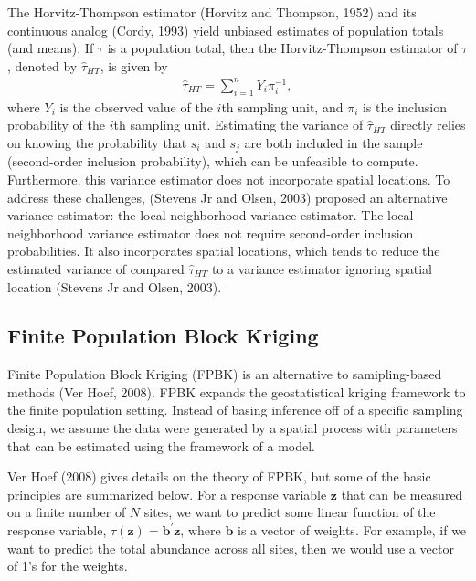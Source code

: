 \documentclass[]{elsarticle} %
\begin{document}
The Horvitz-Thompson estimator (Horvitz and Thompson, 1952) and its
continuous analog (Cordy, 1993) yield unbiased estimates of population
totals (and means). If \(\tau\) is a population total, then the
Horvitz-Thompson estimator of \(\tau\), denoted by \(\hat{\tau}_{HT}\),
is given by \begin{align}\label{eq:htest}
  \hat{\tau}_{HT} = \sum_{i = 1}^n Y_i \pi_i^{-1},
\end{align} where \(Y_i\) is the observed value of the \(i\)th sampling
unit, and \(\pi_i\) is the inclusion probability of the \(i\)th sampling
unit. Estimating the variance of \(\hat{\tau}_{HT}\) directly relies on
knowing the probability that \(s_i\) and \(s_j\) are both included in
the sample (second-order inclusion probability), which can be unfeasible
to compute. Furthermore, this variance estimator does not incorporate
spatial locations. To address these challenges, (Stevens Jr and Olsen,
2003) proposed an alternative variance estimator: the local neighborhood
variance estimator. The local neighborhood variance estimator does not
require second-order inclusion probabilities. It also incorporates
spatial locations, which tends to reduce the estimated variance of
compared \(\hat{\tau}_{HT}\) to a variance estimator ignoring spatial
location (Stevens Jr and Olsen, 2003).

\hypertarget{finite-population-block-kriging}{%
\subsection{Finite Population Block
Kriging}\label{finite-population-block-kriging}}

Finite Population Block Kriging (FPBK) is an alternative to
samipling-based methods (Ver Hoef, 2008). FPBK expands the
geostatistical kriging framework to the finite population setting.
Instead of basing inference off of a specific sampling design, we assume
the data were generated by a spatial process with parameters that can be
estimated using the framework of a model.

Ver Hoef (2008) gives details on the theory of FPBK, but some of the
basic principles are summarized below. For a response variable
\(\mathbf{z}\) that can be measured on a finite number of \(N\) sites,
we want to predict some linear function of the response variable,
\(\tau(\mathbf{z}) = \mathbf{b}^\prime \mathbf{z}\), where
\(\mathbf{b}\) is a vector of weights. For example, if we want to
predict the total abundance across all sites, then we would use a vector
of 1's for the weights.
\end{document}

